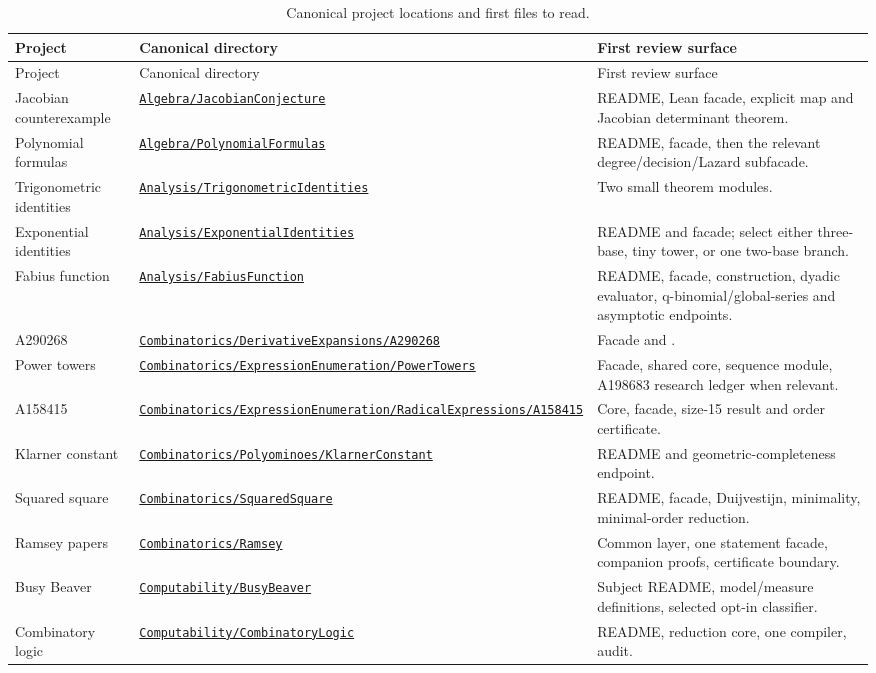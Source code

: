 \documentclass[
  10pt,
  a4paper,
  twoside,
  open=any,
  parskip=half,
  headings=big
]{scrreprt}
\newcommand{\CommitFull}{56a402bf82a9aab119fcbe3e96b991d387b221c5}
\newcommand{\RepoWeb}{https://github.com/VladimirReshetnikov/ProveIt}
\newcommand{\RepoTreeBase}{\RepoWeb/tree/\CommitFull}
\newcommand{\code}[1]{\texttt{\detokenize{#1}}}
\newcommand{\RepoDir}[1]{\href{\RepoTreeBase/#1}{\nolinkurl{#1}}}
\begin{document}
{\small
\begin{longtable}{@{}L{35mm}L{52mm}L{64mm}@{}}
\caption{Canonical project locations and first files to read.}\label{tab:project-index}\\
\toprule
Project & Canonical directory & First review surface \\
\midrule
\endfirsthead
\toprule
Project & Canonical directory & First review surface \\
\midrule
\endhead
\bottomrule
\endfoot
Jacobian counterexample & \RepoDir{Algebra/JacobianConjecture} & README, Lean facade, explicit map and Jacobian determinant theorem. \\
Polynomial formulas & \RepoDir{Algebra/PolynomialFormulas} & README, facade, then the relevant degree/decision/Lazard subfacade. \\
Trigonometric identities & \RepoDir{Analysis/TrigonometricIdentities} & Two small theorem modules. \\
Exponential identities & \RepoDir{Analysis/ExponentialIdentities} & README and facade; select either three-base, tiny tower, or one two-base branch. \\
Fabius function & \RepoDir{Analysis/FabiusFunction} & README, facade, construction, dyadic evaluator, q-binomial/global-series and asymptotic endpoints. \\
A290268 & \RepoDir{Combinatorics/DerivativeExpansions/A290268} & Facade and \code{Main.lean}. \\
Power towers & \RepoDir{Combinatorics/ExpressionEnumeration/PowerTowers} & Facade, shared core, sequence module, A198683 research ledger when relevant. \\
A158415 & \RepoDir{Combinatorics/ExpressionEnumeration/RadicalExpressions/A158415} & Core, facade, size-15 result and order certificate. \\
Klarner constant & \RepoDir{Combinatorics/Polyominoes/KlarnerConstant} & README and geometric-completeness endpoint. \\
Squared square & \RepoDir{Combinatorics/SquaredSquare} & README, facade, Duijvestijn, minimality, minimal-order reduction. \\
Ramsey papers & \RepoDir{Combinatorics/Ramsey} & Common layer, one statement facade, companion proofs, certificate boundary. \\
Busy Beaver & \RepoDir{Computability/BusyBeaver} & Subject README, model/measure definitions, selected opt-in classifier. \\
Combinatory logic & \RepoDir{Computability/CombinatoryLogic} & README, reduction core, one compiler, audit. \\

\end{longtable}}
\end{document}
